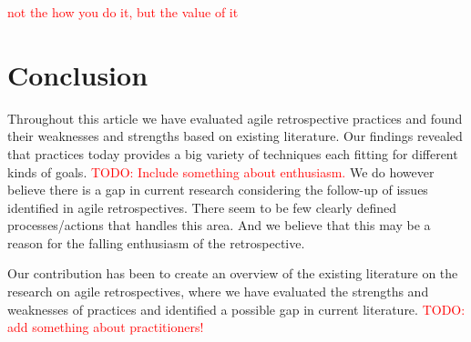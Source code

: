 \documentclass[12pt]{article}
\newcommand\todo[1]{\textcolor{red}{#1}}
\begin{document}
\todo{not the how you do it, but the value of it}

\section{Conclusion}
Throughout this article we have evaluated agile retrospective practices and found their weaknesses and strengths based on existing literature. Our findings revealed that practices today provides a big variety of techniques each fitting for different kinds of goals. \todo{TODO: Include something about enthusiasm.} We do however believe there is a gap in current research considering the follow-up of issues identified in agile retrospectives. There seem to be few clearly defined processes/actions that handles this area. And we believe that this may be a reason for the falling enthusiasm of the retrospective. 

Our contribution has been to create an overview of the existing literature on the research on agile retrospectives, where we have evaluated the strengths and weaknesses of practices and identified a possible gap in current literature. \todo{TODO: add something about practitioners!}

\clearpage



\end{document}
